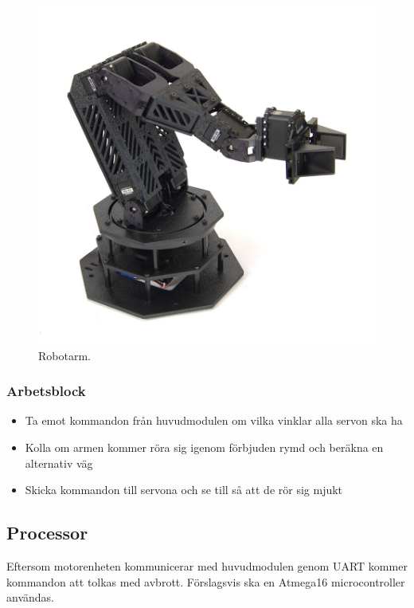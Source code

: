 \begin{figure}[h]
\center
\includegraphics[scale=0.35]{arm}
\caption{Robotarm.}
\end{figure}

\subsubsection{Arbetsblock}

\begin{itemize}
\item Ta emot kommandon från huvudmodulen om vilka vinklar alla servon ska ha
\item Kolla om armen kommer röra sig igenom förbjuden rymd och beräkna en alternativ väg
\item Skicka kommandon till servona och se till så att de rör sig mjukt
\end{itemize}

\subsection{Processor}

Eftersom motorenheten kommunicerar med huvudmodulen genom UART kommer kommandon att tolkas med avbrott. Förslagsvis ska en Atmega16 microcontroller användas.